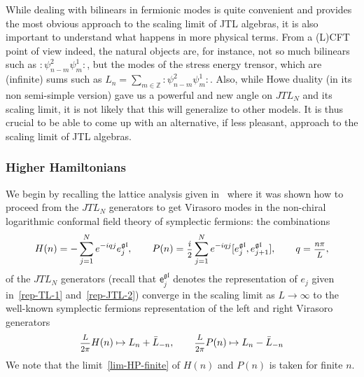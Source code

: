 \documentclass[11pt]{article}
\newcommand{\ffrac}[2]{\mbox{\footnotesize$\displaystyle\frac{#1}{#2}$}}
\newcommand{\JTL}[1]{JTL_{#1}}
\newcommand{\e}{\mathsf{e}}
\newcommand{\sfermp}{\psi^{2}}
\newcommand{\sfermm}{\psi^{1}}
\newcommand{\oZ}{\mathbb{Z}}
\newcommand{\gl}{\mathfrak{gl}}
\newcommand{\nord}[1]{\boldsymbol{\colon}\!\!{#1}\boldsymbol{\colon}\!\!}
\theoremstyle{definition}
\begin{document}
While dealing with  bilinears in fermionic modes is quite convenient and provides  the most obvious approach to the scaling limit of JTL algebras, it is also important to understand what happens in more physical terms. From a  (L)CFT point of view indeed, the natural objects are, for instance,  not so much bilinears such as $\nord{\sfermp_{n-m}\sfermm_m}$, but the modes of the stress energy trensor, which are (infinite) sums such as $L_n=\sum_{m\in\oZ} \nord{\sfermp_{n-m}\sfermm_m}$. Also, while  Howe duality (in its non semi-simple version) gave us a powerful and new angle on $\JTL{N}$ and its scaling limit, it is not likely that this will  generalize to other models. It is thus crucial to be able to come up with an alternative, if less pleasant, approach to the scaling limit of JTL algebras.



\subsubsection{Higher Hamiltonians}\label{sec:hham}
We begin by  recalling the lattice analysis given in~\cite{GRS1}
where it was shown how to proceed from the $\JTL{N}$
generators to get  Virasoro modes in the non-chiral logarithmic
conformal field theory of symplectic fermions:
 the combinations
\begin{equation}\label{HPn-def}
H(n) = -\sum_{j=1}^N e^{-iqj} e^{\gl}_j,\qquad
P(n)=\ffrac{i}{2}\sum_{j=1}^N e^{-iqj} [e^{\gl}_j,e^{\gl}_{j+1}], \qquad q=\ffrac{n\pi}{L},
\end{equation}
of the
$\JTL{N}$ generators (recall that $\e^{\gl}_j$ denotes the representation of $e_j$ given in~\eqref{rep-TL-1} and~\eqref{rep-JTL-2}) converge in the scaling limit as $L\to\infty$ to the well-known symplectic fermions representation
of the left and right Virasoro generators
\begin{equation}\label{lim-HP-finite}
\ffrac{L}{2\pi}H(n) \mapsto
L_{n}+\bar{L}_{-n}, \qquad \ffrac{L}{2\pi}P(n) \mapsto
L_{n}-\bar{L}_{-n}
\end{equation}
We note that the limit~\eqref{lim-HP-finite} of $H(n)$ and $P(n)$ is
taken for finite $n$.
\end{document}
